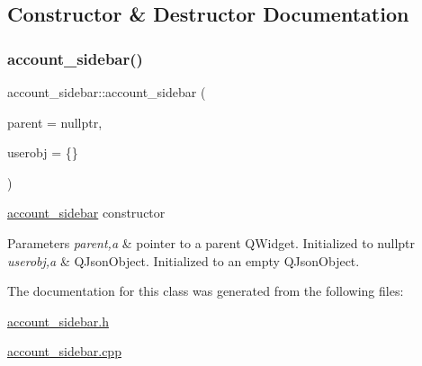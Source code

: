 \subsection{Constructor \& Destructor Documentation}
\mbox{\label{classaccount__sidebar_a6fa648be2eabdef0be7b5f27a16ac7f1}} 
\subsubsection{\texorpdfstring{account\+\_\+sidebar()}{account\_sidebar()}}
{\footnotesize\ttfamily account\+\_\+sidebar\+::account\+\_\+sidebar (\begin{DoxyParamCaption}\item[{Q\+Widget $\ast$}]{parent = {\ttfamily nullptr},  }\item[{Q\+Json\+Object}]{userobj = {\ttfamily \{\}} }\end{DoxyParamCaption})\hspace{0.3cm}{\ttfamily [explicit]}}



\hyperlink{classaccount__sidebar}{account\+\_\+sidebar} constructor 


\begin{DoxyParams}{Parameters}
{\em parent,a} & pointer to a parent Q\+Widget. Initialized to nullptr \\
\hline
{\em userobj,a} & Q\+Json\+Object. Initialized to an empty Q\+Json\+Object. \\
\hline
\end{DoxyParams}


The documentation for this class was generated from the following files\+:\begin{DoxyCompactItemize}
\item 
\hyperlink{account__sidebar_8h}{account\+\_\+sidebar.\+h}\item 
\hyperlink{account__sidebar_8cpp}{account\+\_\+sidebar.\+cpp}\end{DoxyCompactItemize}
